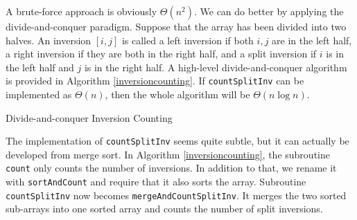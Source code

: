 A brute-force approach is obviously $\Theta(n^2)$. We can do better by applying the divide-and-conquer paradigm. Suppose that the array has been divided into two halves. An inversion $[i,j]$ is called a left inversion if both $i,j$ are in the left half, a right inversion if they are both in the right half, and a split inversion if $i$ is in the left half and $j$ is in the right half. A high-level divide-and-conquer algorithm is provided in Algorithm \ref{inversioncounting}. If \texttt{countSplitInv} can be implemented as $\Theta(n)$, then the whole algorithm will be $\Theta(n\log n)$.
\begin{algorithm}[ht]
\caption{Divide-and-conquer Inversion Counting}\label{inversioncounting}
\begin{algorithmic}[1]
\Input{}
\Output{}
\Else
{}
\EndIf
\EndFunction
\end{algorithmic}
\end{algorithm}

The implementation of \texttt{countSplitInv} seems quite subtle, but it can actually be developed from merge sort. In Algorithm \ref{inversioncounting}, the subroutine \texttt{count} only counts the number of inversions. In addition to that, we rename it with \texttt{sortAndCount} and require that it also sorts the array. Subroutine \texttt{countSplitInv} now becomes \texttt{mergeAndCountSplitInv}. It merges the two sorted sub-arrays into one sorted array and counts the number of split inversions.

